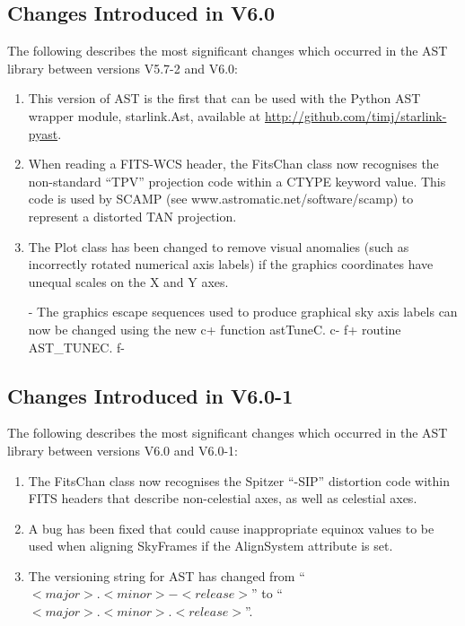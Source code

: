 \documentclass[twoside,11pt]{starlink}
\begin{document}
\subsection{Changes Introduced in V6.0}

The following describes the most significant changes which
occurred in the AST library between versions V5.7-2 and V6.0:

\begin{enumerate}

\item This version of AST is the first that can be used with the Python
AST wrapper module, starlink.Ast, available at \url{http://github.com/timj/starlink-pyast}.

\item When reading a FITS-WCS header, the FitsChan class now recognises the
non-standard ``TPV'' projection code within a CTYPE keyword value. This
code is used by SCAMP (see www.astromatic.net/software/scamp) to
represent a distorted TAN projection.

\item The Plot class has been changed to remove visual anomalies (such as
incorrectly rotated numerical axis labels) if the graphics coordinates have
unequal scales on the X and Y axes.

- The graphics escape sequences used to produce graphical sky axis labels
can now be changed using the new
c+
function astTuneC.
c-
f+
routine AST\_TUNEC.
f-

\end{enumerate}

\subsection{Changes Introduced in V6.0-1}

The following describes the most significant changes which
occurred in the AST library between versions V6.0 and V6.0-1:

\begin{enumerate}

\item The FitsChan class now recognises the Spitzer ``-SIP'' distortion
code within FITS headers that describe non-celestial axes, as well as
celestial axes.

\item A bug has been fixed that could cause inappropriate equinox values to
be used when aligning SkyFrames if the AlignSystem attribute is set.

\item The versioning string for AST has changed from
``$<major>.<minor>-<release>$'' to ``$<major>.<minor>.<release>$''.

\end{enumerate}
\end{document}
